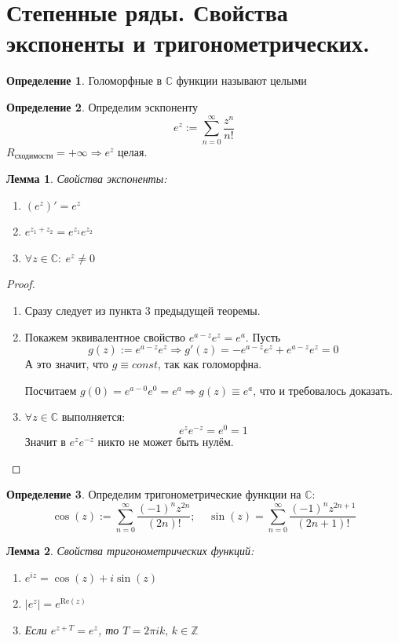 \documentclass[a4paper,12pt]{article}
\theoremstyle{plain}
\newtheorem{lemma}{Лемма}[section]
\theoremstyle{definition}
\newtheorem{definition}{Определение}[section]
\theoremstyle{remark}
\begin{document}
\section{Степенные ряды. Свойства экспоненты и тригонометрических.}
\begin{definition}
	Голоморфные в $\mathbb{C}$ функции называют целыми
\end{definition}

\begin{definition}
	Определим эскпоненту
	\[
		e^z := \sum_{n = 0}^\infty \frac{z^n}{n!}
	\]
	$R_\text{сходимости} = +\infty \Rightarrow e^z$ целая.
\end{definition}

\begin{lemma}
	Свойства экспоненты:
	\begin{enumerate}
		\item $(e^z)' = e^z$
		\item $e^{z_1 + z_2} = e^{z_1}e^{z_2}$
		\item $\forall z \in \mathbb{C} :\: e^z \neq 0$
	\end{enumerate}
\end{lemma}

\begin{proof}
	\begin{enumerate}
		\item Сразу следует из пункта 3 предыдущей теоремы.
		\item Покажем эквивалентное свойство $e^{a - z}e^z = e^a$. Пусть
		      \[
			      g(z) := e^{a - z}e^z \Rightarrow g'(z) = -e^{a - z}e^z + e^{a - z}e^z = 0
		      \]
		      А это значит, что $g \equiv const$, так как голоморфна.

		      Посчитаем $g(0) = e^{a - 0}e^0 = e^a \Rightarrow g(z) \equiv e^a$, что и требовалось доказать.
		\item $\forall z \in \mathbb{C}$ выполняется:
		      \[
			      e^ze^{-z} = e^0 = 1
		      \]
		      Значит в $e^ze^{-z}$ никто не может быть нулём.
	\end{enumerate}
\end{proof}

\begin{definition}
	Определим тригонометрические функции на $\mathbb{C}$:
	\[
		\cos(z) := \sum_{n = 0}^\infty \frac{(-1)^nz^{2n}}{(2n)!} ;\;\;\;\; \sin(z) = \sum_{n = 0}^\infty \frac{(-1)^nz^{2n + 1}}{(2n + 1)!}
	\]
\end{definition}

\begin{lemma}
	Свойства тригонометрических функций:
	\begin{enumerate}
		\item $e^{iz} = \cos(z) + i\sin(z)$
		\item $\vert e^z\vert = e^{\text{Re}(z)}$
		\item Если $e^{z + T} = e^z$, то $T = 2\pi ik,\, k \in \mathbb{Z}$
	\end{enumerate}
\end{lemma}
\end{document}
